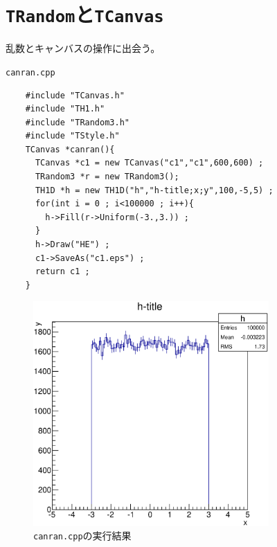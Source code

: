 \clearpage
 \section{\texttt{TRandom}と\texttt{TCanvas}}

 乱数とキャンバスの操作に出会う。

 \begin{itembox}{\texttt{canran.cpp}}
\begin{verbatim}
	#include "TCanvas.h"
	#include "TH1.h"
	#include "TRandom3.h"
	#include "TStyle.h"
	TCanvas *canran(){
	  TCanvas *c1 = new TCanvas("c1","c1",600,600) ;
	  TRandom3 *r = new TRandom3();
	  TH1D *h = new TH1D("h","h-title;x;y",100,-5,5) ;
	  for(int i = 0 ; i<100000 ; i++){
	    h->Fill(r->Uniform(-3.,3.)) ;
	  }
	  h->Draw("HE") ;
	  c1->SaveAs("c1.eps") ;
	  return c1 ;
	}
\end{verbatim}
 \end{itembox}


 \begin{figure}[htbp]
  \begin{center}
   \includegraphics[width = 90mm] {./picture/canrancanvas1.eps}
  \end{center}
  \caption{\texttt{canran.cpp}の実行結果}
  \label{Fig:canrancanvas1}
 \end{figure}


